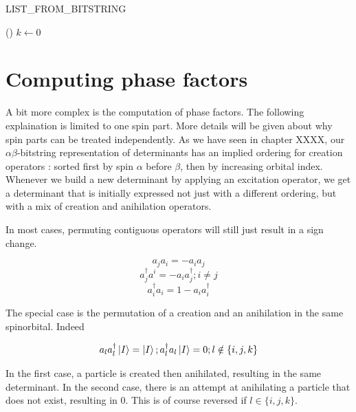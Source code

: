 \documentclass[./thesis.tex]{subfiles}
\begin{document}
\begin{algorithm}[h!]
	\caption{LIST\_FROM\_BITSTRING}
	\label{alg:LIST_FROM_BITSTRING}
	
	\Fn(){}{
		$k \gets 0$ \;
		}
		
\end{algorithm}



\section{Computing phase factors}



A bit more complex is the computation of phase factors. The following explaination is limited to one spin part. More details will be given about why spin parts can be treated independently.
As we have seen in chapter XXXX, our $\alpha \beta$-bitstring representation of determinants has an implied ordering for creation operators : sorted first by spin $\alpha$ before $\beta$, then by increasing orbital index.
Whenever we build a new determinant by applying an excitation operator, we get a determinant that is initially expressed not just with a different ordering, but with a mix of creation and anihilation operators.

In most cases, permuting contiguous operators will still just result in a sign change.

$$a_j a_i = -a_i a_j$$
$$a^\dagger_j a^i = -a_i a^\dagger_j ; i \neq j$$
$$a^\dagger_i a_i = 1-a_i a^\dagger_i$$

The special case is the permutation of a creation and an anihilation in the same spinorbital. Indeed

$$a_l a^\dagger_l \ket I  = \ket I ; a^\dagger_l a_l \ket I = 0 ; l \notin \{i,j,k\}$$

In the first case, a particle is created then anihilated, resulting in the same determinant. In the second case, there is an attempt at anihilating a particle that does not exist, resulting in $0$. This is of course reversed if $l \in \{i,j,k\}$.
\end{document}
